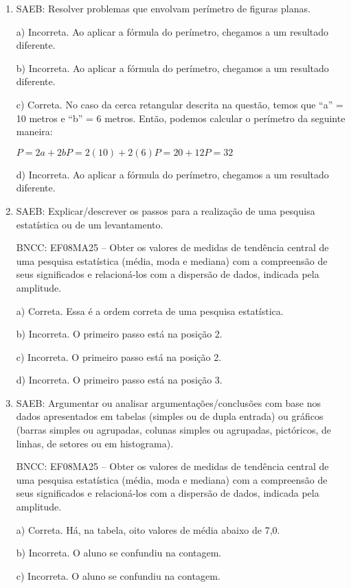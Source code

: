 \begin{enumerate}
\item SAEB: Resolver problemas que envolvam perímetro de figuras planas.

a) Incorreta. Ao aplicar a fórmula do perímetro, chegamos a um
resultado diferente.

b) Incorreta. Ao aplicar a fórmula do perímetro, chegamos a um
resultado diferente.

c) Correta. No caso da cerca retangular descrita na questão, temos
que ``a'' = 10 metros e ``b'' = 6 metros. Então, podemos calcular o
perímetro da seguinte maneira:

$P = 2a + 2b P = 2(10) + 2(6) P = 20 + 12 P = 32$

d) Incorreta. Ao aplicar a fórmula do perímetro, chegamos a um
resultado diferente.

\item SAEB: Explicar/descrever os passos para a realização de uma pesquisa
estatística ou de um levantamento.

BNCC: EF08MA25 -- Obter os valores de medidas de tendência central de
uma pesquisa estatística (média, moda e mediana) com a compreensão de
seus significados e relacioná-los com a dispersão de dados, indicada
pela amplitude.

a) Correta. Essa é a ordem correta de uma pesquisa estatística.

b) Incorreta. O primeiro passo está na posição 2.

c) Incorreta. O primeiro passo está na posição 2.

d) Incorreta. O primeiro passo está na posição 3.

\item SAEB: Argumentar ou analisar argumentações/conclusões com base nos dados
apresentados em tabelas (simples ou de dupla entrada) ou gráficos
(barras simples ou agrupadas, colunas simples ou agrupadas, pictóricos,
de linhas, de setores ou em histograma).

BNCC: EF08MA25 -- Obter os valores de medidas de tendência central de
uma pesquisa estatística (média, moda e mediana) com a compreensão de
seus significados e relacioná-los com a dispersão de dados, indicada
pela amplitude.

a) Correta. Há, na tabela, oito valores de média abaixo de 7,0.

b) Incorreta. O aluno se confundiu na contagem.

c) Incorreta. O aluno se confundiu na contagem.


\end{enumerate}
